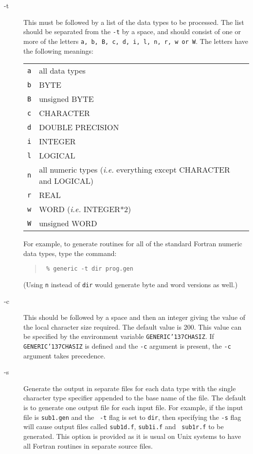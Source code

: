 \documentclass[twoside,11pt]{article}
\renewcommand{\_}{{\tt\char'137}}     %
\begin{document}
\begin{description}

\item[-t] This must be followed by a list of the data types to be
processed. The list should be separated from the {\tt -t} by a space,
and should consist of one or more of the letters {\tt a, b, B, c, d, i, l,
n, r, w or W}.  The letters have the following meanings:
\begin{center}
\begin{tabular}{ll}
{\tt a} & all data types \\
{\tt b} & BYTE \\
{\tt B} & unsigned BYTE \\
{\tt c} & CHARACTER \\
{\tt d} & DOUBLE PRECISION \\
{\tt i} & INTEGER \\
{\tt l} & LOGICAL \\
{\tt n} & all numeric types (\emph{i.e.} everything except CHARACTER and LOGICAL)\\
{\tt r} & REAL \\
{\tt w} & WORD (\emph{i.e.} INTEGER*2) \\
{\tt W} & unsigned WORD \\
\end{tabular}
\end{center}

For example, to generate routines for all of the standard Fortran numeric data
types, type the command:

\begin{quote}{\tt
\% generic -t dir prog.gen
}
\end{quote}

(Using {\tt n} instead of {\tt dir} would generate byte and word versions as
well.)

\item[-c] This should be followed by a space and then an integer
giving the value of the local character size required.  The default
value is 200. This value can be specified by the environment variable
{\tt GENERIC\_CHASIZ}.  If {\tt GENERIC\_CHASIZ} is defined and the
{\tt -c} argument is present, the {\tt -c} argument takes precedence.

\item[-s] Generate the output in separate files for each data type
with the single character type specifier appended to the base name of
the file.  The default is to generate one output file for each input
file.  For example, if the input file is {\tt sub1.gen} and the {\tt
-t} flag is set to {\tt dir}, then specifying the {\tt -s} flag will
cause output files called {\tt sub1d.f}, {\tt sub1i.f} and {\tt
sub1r.f} to be generated.  This option is provided as it is usual on
Unix systems to have all Fortran routines in separate source files.


\end{description}
\end{document}
